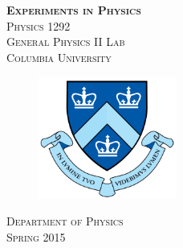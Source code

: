 \begin{titlepage}
\begin{center}
\textsc{\Huge\bf Experiments in Physics}
\\[5cm]
\textsc{\huge Physics 1292}
\\[0.3cm]
\textsc{\huge General Physics II Lab}
\\[4cm]
\textsc{\large Columbia University}
\\[0.5cm]
\begin{figure}[h]
  \centering
  \includegraphics[height=4cm]{./pic/Columbia-Logo.png}
\end{figure}
\textsc{Department of Physics}
\\[1cm]
\textsc{Spring 2015}
\end{center}
\end{titlepage}

